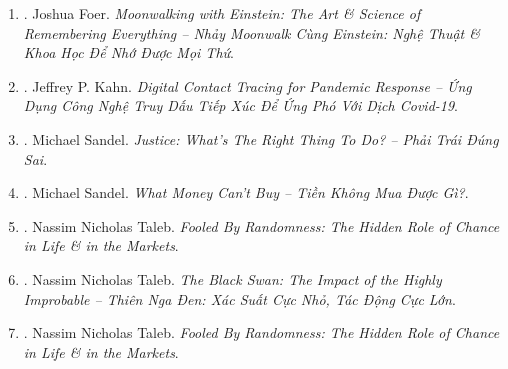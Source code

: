 \documentclass{article}
\begin{document}
\begin{enumerate}
\begin{itemize}
		\item ``{\sc Joshua Foer} proves what few of us are willing to get our heads around: there's more room in our brains that we ever imagined. {\it Moonwalking with {\sc Einstein}} isn't a how-to guide to remembering a name or where you put your keys. It's a riveting exploration of humankind's centuries-old obsession with memory, \& 1 man's improbable quest to master his own.'' -- {\sc Stefan Fatsis}, author of {\it A Few Seconds of Panic \& Word Freak}
	\end{itemize}
	{\sf About the Author.} {\sc Joshua Foer} was born in Washington, DC in 1982 \& lives in New Haven, CT with his wife Dinah. His writing has appeared in {\it National Geographic, Esquire, Slate, Outside, New York Times}, \& other publications. He is the co-founder of the Atlas Obscura, an online guide to the world's wonders \& curiosities. He is also the co-founder of the architectural design competition, Sukkah City. {\it Moonwalking with {\sc Einstein}} is his 1st book.
		
	\item \cite{Foer_remember_VN}. {\sc Joshua Foer}. {\it Moonwalking with Einstein: The Art \& Science of Remembering Everything -- Nhảy Moonwalk Cùng Einstein: Nghệ Thuật \& Khoa Học Để Nhớ Được Mọi Thứ}.\hfill{\sf[done]}
	
	\item \cite{Kahn_diginal_pandemic_VN}. Jeffrey P. Kahn. {\it Digital Contact Tracing for Pandemic Response -- Ứng Dụng Công Nghệ Truy Dấu Tiếp Xúc Để Ứng Phó Với Dịch Covid-19}.\hfill{\sf[done]}
	
	\item \cite{Sandel_justice}. Michael Sandel. {\it Justice: What's The Right Thing To Do? -- Phải Trái Đúng Sai}.\hfill{\sf[done]}
	
	\item \cite{Sandel_money}. Michael Sandel. {\it What Money Can't Buy -- Tiền Không Mua Được Gì?}.\hfill{\sf[done]}
	
	\item \cite{Taleb_randomness}. Nassim Nicholas Taleb. {\it Fooled By Randomness: The Hidden Role of Chance in Life \& in the Markets}.\hfill{\sf[reading]}
	
	\item \cite{Taleb_black_swan_VN}. Nassim Nicholas Taleb. {\it The Black Swan: The Impact of the Highly Improbable -- Thiên Nga Đen: Xác Suất Cực Nhỏ, Tác Động Cực Lớn}.\hfill{\sf[done]}
	
	\item \cite{Taleb_randomness}. Nassim Nicholas Taleb. {\it Fooled By Randomness: The Hidden Role of Chance in Life \& in the Markets}.
	

\end{enumerate}
\end{document}

